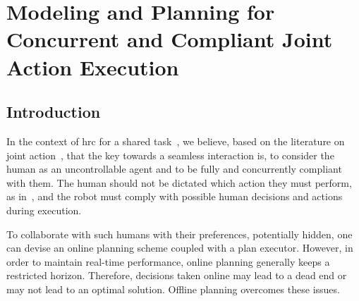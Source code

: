 \ifdefined{}
\else
\setcounter{chapter}{3} %
\dominitoc
\faketableofcontents
\fi

\chapter{Modeling and Planning for Concurrent and Compliant Joint Action Execution}
\label{chap:4}
\minitoc


\section{Introduction}


In the context of \acrshort{hrc} for a shared task~\cite{selvaggio2021autonomy}, we believe, based on the literature on joint action~\cite{sebanz_2006joint,sebanz-2009,clodic-2017,gordon-2023}, that the key towards a seamless interaction is, to consider the human as an uncontrollable agent and to be fully and concurrently compliant with them. 
The human should not be dictated which action they must perform, as in~\cite{roncone2017transparent,buisan_hatpehda_icra}, and the robot must comply with possible human decisions and actions during execution.

To collaborate with such humans with their preferences, potentially hidden, one can devise an online planning scheme coupled with a plan executor. 
However, in order to maintain real-time performance, online planning generally keeps a restricted horizon. 
Therefore, decisions taken online may lead to a dead end or may not lead to an optimal solution. 
Offline planning overcomes these issues. 

